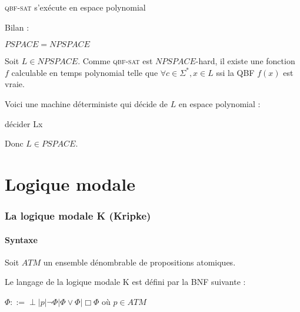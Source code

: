 \documentclass[10pt,a4paper]{article}
\begin{document}
\begin{dem} 

\textsc{qbf-sat} s'exécute en espace polynomial

\end{dem}

Bilan : 
\begin{thm}[de Savitch]
 $PSPACE = NPSPACE$
\end{thm}
\begin{dem}
 Soit $L \in NPSPACE$. Comme \textsc{qbf-sat} est $NPSPACE$-hard, il existe une fonction $f$ calculable en temps polynomial telle que
 $\forall c \in \Sigma^*, x \in L$ ssi la QBF $f(x)$ est vraie.

Voici une machine déterministe qui décide de $L$ en espace polynomial :

\begin{algorithm}{décider L}{x}
 \RETURN {}
\end{algorithm}

Donc $L \in PSPACE$.
\end{dem}


\part{Logique modale}

\section{La logique modale K (Kripke)}

\subsection{Syntaxe}

Soit $ATM$ un ensemble dénombrable de propositions atomiques.
\begin{definition}
 Le langage de la logique modale K est défini par la BNF suivante :

$\Phi ::= \perp  |  p  |  \lnot \Phi  |  \Phi \vee \Phi  |  \Box \Phi$ où $p \in ATM$
\end{definition}
\end{document}
